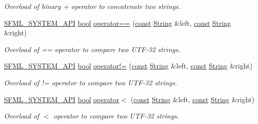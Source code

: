 \begin{DoxyCompactItemize}
\begin{DoxyCompactList}\small\item\em Overload of binary + operator to concatenate two strings. \end{DoxyCompactList}\item 
\hyperlink{sfml_2dep_2_s_f_m_l-2_84_82_2include_2_s_f_m_l_2_system_2_export_8hpp_a6476c9e422606477a4c23d92b1d79a1f}{S\-F\-M\-L\-\_\-\-S\-Y\-S\-T\-E\-M\-\_\-\-A\-P\-I} \hyperlink{term__entry_8h_a002004ba5d663f149f6c38064926abac}{bool} \hyperlink{classsf_1_1_string_a2a385459fa9a237e61a712fa956d489e}{operator==} (\hyperlink{term__entry_8h_a57bd63ce7f9a353488880e3de6692d5a}{const} \hyperlink{classsf_1_1_string}{String} \&left, \hyperlink{term__entry_8h_a57bd63ce7f9a353488880e3de6692d5a}{const} \hyperlink{classsf_1_1_string}{String} \&right)
\begin{DoxyCompactList}\small\item\em Overload of == operator to compare two U\-T\-F-\/32 strings. \end{DoxyCompactList}\item 
\hyperlink{sfml_2dep_2_s_f_m_l-2_84_82_2include_2_s_f_m_l_2_system_2_export_8hpp_a6476c9e422606477a4c23d92b1d79a1f}{S\-F\-M\-L\-\_\-\-S\-Y\-S\-T\-E\-M\-\_\-\-A\-P\-I} \hyperlink{term__entry_8h_a002004ba5d663f149f6c38064926abac}{bool} \hyperlink{classsf_1_1_string_a2b592c36be218b4811795fdc84eecc69}{operator!=} (\hyperlink{term__entry_8h_a57bd63ce7f9a353488880e3de6692d5a}{const} \hyperlink{classsf_1_1_string}{String} \&left, \hyperlink{term__entry_8h_a57bd63ce7f9a353488880e3de6692d5a}{const} \hyperlink{classsf_1_1_string}{String} \&right)
\begin{DoxyCompactList}\small\item\em Overload of != operator to compare two U\-T\-F-\/32 strings. \end{DoxyCompactList}\item 
\hyperlink{sfml_2dep_2_s_f_m_l-2_84_82_2include_2_s_f_m_l_2_system_2_export_8hpp_a6476c9e422606477a4c23d92b1d79a1f}{S\-F\-M\-L\-\_\-\-S\-Y\-S\-T\-E\-M\-\_\-\-A\-P\-I} \hyperlink{term__entry_8h_a002004ba5d663f149f6c38064926abac}{bool} \hyperlink{classsf_1_1_string_ac2ca5a7703402a2bbafd85eec6d1e846}{operator$<$} (\hyperlink{term__entry_8h_a57bd63ce7f9a353488880e3de6692d5a}{const} \hyperlink{classsf_1_1_string}{String} \&left, \hyperlink{term__entry_8h_a57bd63ce7f9a353488880e3de6692d5a}{const} \hyperlink{classsf_1_1_string}{String} \&right)
\begin{DoxyCompactList}\small\item\em Overload of $<$ operator to compare two U\-T\-F-\/32 strings. \end{DoxyCompactList}\item 

\end{DoxyCompactItemize}
